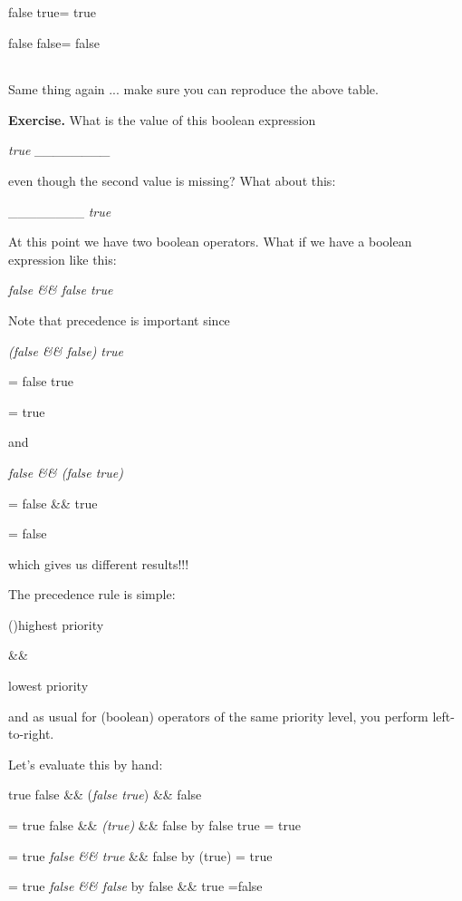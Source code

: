 \documentclass[
]{article}
\begin{document}
false \emph{\textbar\textbar{}} true= true

false \emph{\textbar\textbar{}} false= false

\begin{longtable}[]{@{}@{}}
\toprule
\endhead
\bottomrule
\end{longtable}

Same thing again ... make sure you can reproduce the above table.

\textbf{Exercise.} What is the value of this boolean expression

\emph{true \textbar\textbar{} \_\_\_\_\_\_\_\_}

even though the second value is missing? What about this:

\_\_\_\_\_\_\_\_ \emph{\textbar\textbar{} true}

At this point we have two boolean operators. What if we have a boolean
expression like this:

\emph{false \&\& false \textbar\textbar{} true}

Note that precedence is important since

\emph{ (false \&\& false) \textbar\textbar{} true }

= false \textbar\textbar{} true

= true

and

\emph{ false \&\& (false \textbar\textbar{} true) }

= false \&\& true

= false

which gives us different results!!!

The precedence rule is simple:

()highest priority

\&\&

\emph{\textbar\textbar{} }lowest priority

and as usual for (boolean) operators of the same priority level, you
perform left-to-right.

Let's evaluate this by hand:

true \textbar\textbar{} false \&\& (\emph{false \textbar\textbar{}
true}) \&\& false

= true \textbar\textbar{} false \&\& \emph{(true)} \&\& false by false
\textbar\textbar{} true = true

= true \textbar\textbar{} \emph{false \&\& true} \&\& false by (true) =
true

= true \textbar\textbar{} \emph{false \&\& false} by false \&\& true
=false
\end{document}
